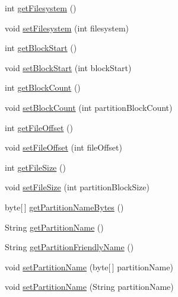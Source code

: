 \begin{DoxyCompactItemize}
\item 
int \hyperlink{classCASUAL_1_1archiving_1_1libpit_1_1PitEntry_a7bd0ed05426235715456a03d85d4add7}{get\-Filesystem} ()
\item 
void \hyperlink{classCASUAL_1_1archiving_1_1libpit_1_1PitEntry_aaa4ed31403b52a9d53aeec85e1ff49bd}{set\-Filesystem} (int filesystem)
\item 
int \hyperlink{classCASUAL_1_1archiving_1_1libpit_1_1PitEntry_ab2d83a89e4caa5a2396065cc8351b1a4}{get\-Block\-Start} ()
\item 
void \hyperlink{classCASUAL_1_1archiving_1_1libpit_1_1PitEntry_ad62d20ea45e2b47741376c567fbf5abb}{set\-Block\-Start} (int block\-Start)
\item 
int \hyperlink{classCASUAL_1_1archiving_1_1libpit_1_1PitEntry_a71f70a12ea451e371d05724bf1be8893}{get\-Block\-Count} ()
\item 
void \hyperlink{classCASUAL_1_1archiving_1_1libpit_1_1PitEntry_a30bbfb8aad7ebb3e1e67a97a9e0dff39}{set\-Block\-Count} (int partition\-Block\-Count)
\item 
int \hyperlink{classCASUAL_1_1archiving_1_1libpit_1_1PitEntry_a18188ca9574796012da0e09c7d0ea26e}{get\-File\-Offset} ()
\item 
void \hyperlink{classCASUAL_1_1archiving_1_1libpit_1_1PitEntry_a4196abd6bae4940c3ed5d5a0eb95c6bb}{set\-File\-Offset} (int file\-Offset)
\item 
int \hyperlink{classCASUAL_1_1archiving_1_1libpit_1_1PitEntry_a01deff38488725386c61df5a471f174c}{get\-File\-Size} ()
\item 
void \hyperlink{classCASUAL_1_1archiving_1_1libpit_1_1PitEntry_a86955e5ab2b342c853cc4b67fe0749b9}{set\-File\-Size} (int partition\-Block\-Size)
\item 
byte\mbox{[}$\,$\mbox{]} \hyperlink{classCASUAL_1_1archiving_1_1libpit_1_1PitEntry_aecce239dfd9e37cf3f336e70b246d6cc}{get\-Partition\-Name\-Bytes} ()
\item 
String \hyperlink{classCASUAL_1_1archiving_1_1libpit_1_1PitEntry_a59b8dd55f03fa04659a3c2b4d10902f1}{get\-Partition\-Name} ()
\item 
String \hyperlink{classCASUAL_1_1archiving_1_1libpit_1_1PitEntry_a67d785987fd5e3db81f397e9aebfcb0d}{get\-Partition\-Friendly\-Name} ()
\item 
void \hyperlink{classCASUAL_1_1archiving_1_1libpit_1_1PitEntry_ad8aabdd2d4ed27f78caff057a86463a5}{set\-Partition\-Name} (byte\mbox{[}$\,$\mbox{]} partition\-Name)
\item 
void \hyperlink{classCASUAL_1_1archiving_1_1libpit_1_1PitEntry_ae11c9323f73814e25d10d9ef29de25ba}{set\-Partition\-Name} (String partition\-Name)

\end{DoxyCompactItemize}
